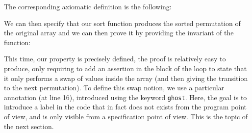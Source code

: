 The corresponding axiomatic definition is the following:






We can then specify that our sort function produces the sorted
permutation of the original array and we can then prove it by providing
the invariant of the function:






This time, our property is precisely defined, the proof is relatively
easy to produce, only requiring to add an assertion in the block of the
loop to state that it only performs a swap of values inside the array
(and then giving the transition to the next permutation). To define this
swap notion, we use a particular annotation (at line 16), introduced
using the keyword \texttt{ghost}. Here, the goal is to introduce a label
in the code that in fact does not exists from the program point of view,
and is only visible from a specification point of view. This is the
topic of the next section.

